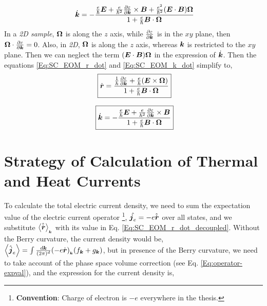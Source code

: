 \documentclass{report}
\renewcommand\vec[1]{\ensuremath\boldsymbol{#1}} %
\begin{document}
\begin{equation}~\label{Eq:SC_EOM_k_dot}
	\dot{\vec{k}} = -\frac{\frac{e}{\hbar} \vec{E} +\frac{e}{\hbar^2} \frac{\partial \varepsilon}{\partial \vec{k}} \times \vec{B} + \frac{e^2}{\hbar^2} (\vec{E}\cdot\vec{B}) \vec{\Omega}}{1 + \frac{e}{\hbar} \vec{B}\cdot\vec{\Omega}}
\end{equation}
In a \textit{2D sample}, $\vec{\Omega}$ is along the $z$ axis, while $\frac{\partial \varepsilon}{\partial \vec{k}}$ is in the $xy$ plane, then $\vec{\Omega} \cdot \frac{\partial \varepsilon}{\partial \vec{k}} = 0$. Also, in \textit{2D}, $\vec{\Omega}$ is along the $z$ axis, whereas $\vec{k}$ is restricted to the $xy$ plane. Then we can neglect the term $(\vec{E}\cdot\vec{B}) \vec{\Omega}$ in the expression of $\dot{\vec{k}}$.
Then the equations \eqref{Eq:SC_EOM_r_dot} and \eqref{Eq:SC_EOM_k_dot} simplify to,
\begin{equation}~\label{Eq:SC_EOM_r_dot_decoupled}
	\boxed{\dot{\vec{r}} = \frac{\frac{1}{\hbar} \frac{\partial \varepsilon}{\partial \vec{k}} + \frac{e}{\hbar} (\vec{E}\times\vec{\Omega})}{1 + \frac{e}{\hbar} \vec{B}\cdot\vec{\Omega}}}
\end{equation}

\begin{equation}~\label{Eq:SC_EOM_k_dot_decoupled}
	\boxed{\dot{\vec{k}} = -\frac{\frac{e}{\hbar} \vec{E} +\frac{e}{\hbar^2} \frac{\partial \varepsilon}{\partial \vec{k}} \times \vec{B}}{1 + \frac{e}{\hbar} \vec{B}\cdot\vec{\Omega}}}
\end{equation}
\chapter{Strategy of Calculation of Thermal and Heat Currents}
To calculate the total electric current density, we need to sum the expectation value of the electric current operator \footnote{\textbf{Convention}: Charge of electron is $-e$ everywhere in the thesis.}, $\hat{\vec{j}_e} = -e \hat{\dot{\vec{r}}}$ over all states, and we substitute $\expval{\hat{\dot{\vec{r}}}}_{_{\vec{k}}}$ with its value in Eq. \eqref{Eq:SC_EOM_r_dot_decoupled}. Without the Berry curvature, the current density would be, $\expval{\hat{\vec{j}}_e} = \int \frac{d\vec{k}}{(2\pi)^d} (- e \dot{\vec{r}})_{_{\vec{k}}} ({f}_{\vec{k}} + {g}_{\vec{k}})$, but in presence of the Berry curvature, we need to take account of the phase space volume correction (see Eq. \eqref{Eq:operator-expval}), and the expression for the current density is,
\end{document}
